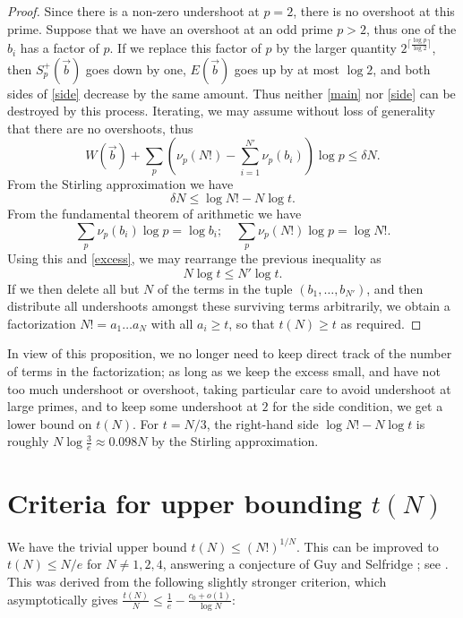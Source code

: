 \documentclass[12pt,a4paper,reqno]{amsart}
\numberwithin{equation}{section}
\theoremstyle{plain}
\theoremstyle{definition}
\begin{document}
\begin{proof}  Since there is a non-zero undershoot at $p=2$, there is no overshoot at this prime. Suppose that we have an overshoot at an odd prime $p>2$, thus one of the $b_i$ has a factor of $p$. If we replace this factor of $p$ by the larger quantity $2^{\lceil \frac{\log p}{\log 2} \rceil}$, then $S^+_p(\vec b)$ goes down by one, $E(\vec b)$ goes up by at most $\log 2$, and both sides of \eqref{side} decrease by the same amount.  Thus neither \eqref{main} nor \eqref{side} can be destroyed by this process.  Iterating, we may assume without loss of generality that there are no overshoots, thus
 $$  W(\vec b) + \sum_p (\nu_p(N!) - \sum_{i=1}^{N'} \nu_p(b_i))\log p \leq \delta N.$$
 From the Stirling approximation we have
 $$ \delta N \leq \log N! - N \log t.$$
From the fundamental theorem of arithmetic we have
$$ \sum_p \nu_p(b_i) \log p = \log b_i; \quad \sum_p \nu_p(N!) \log p = \log N!.$$
Using this and \eqref{excess}, we may rearrange the previous inequality as
$$ N \log t \leq N' \log t.$$
If we then delete all but $N$ of the terms in the tuple $(b_1,\dots,b_{N'})$, and then distribute all undershoots amongst these surviving terms arbitrarily, we obtain a factorization $N! = a_1 \dots a_N$ with all $a_i \geq t$, so that $t(N) \geq t$ as required.
\end{proof}

In view of this proposition, we no longer need to keep direct track of the number of terms in the factorization; as long as we keep the excess small, and have not too much undershoot or overshoot, taking particular care to avoid undershoot at large primes, and to keep some undershoot at $2$ for the side condition, we get a lower bound on $t(N)$.  For $t = N/3$, the right-hand side $\log N! - N \log t$ is roughly $N \log \frac{3}{e} \approx 0.098 N$ by the Stirling approximation.



\section{Criteria for upper bounding $t(N)$}

We have the trivial upper bound $t(N) \leq (N!)^{1/N}$.  This can be improved to $t(N) \leq N/e$ for $N \neq 1,2,4$, answering a conjecture of Guy and Selfridge \cite{guy-selfridge}; see \cite{tao}.  This was derived from the following slightly stronger criterion, which asymptotically gives $\frac{t(N)}{N} \leq \frac{1}{e} - \frac{c_0+o(1)}{\log N}$:
\end{document}
